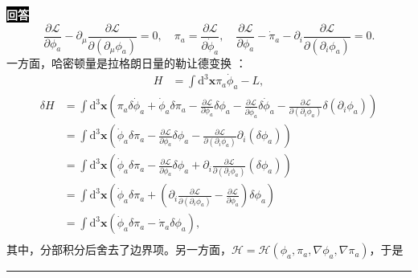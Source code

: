 \documentclass[11pt,a4paper]{ctexart}
\newenvironment{answer}
  {\par\smallskip\noindent
   \begingroup
   \setlength{\fboxsep}{4pt}%
   \colorbox{black}{\textcolor{white}{\bfseries 回答}}%
   \endgroup
   \quad\ignorespaces}
  {\par\smallskip\noindent\rule{\linewidth}{0.4pt}\medskip}
\begin{document}
\begin{answer}
  \begin{equation}
    \frac{\partial \mathcal{L} }{\partial \phi_a } - \partial_\mu \frac{\partial \mathcal{L} }{\partial\left(\partial_\mu\phi_a \right) }
    =0,\quad
    \pi_a
    =\frac{\partial \mathcal{L} }{\partial\dot{\phi}_a },\quad
    \frac{\partial \mathcal{L} }{\partial \phi_a } - \dot{\pi}_a - \partial_i\frac{\partial\mathcal{L} }{\partial\left(\partial_i\phi_a \right) }
    =0. 
  \end{equation}
  一方面，哈密顿量是拉格朗日量的勒让德变换 ：
  \begin{equation}
    \begin{aligned}
      H
      &=\int \mathrm{d}^3\bm{x} \pi_a \dot{\phi}_a - L,
    \end{aligned}
  \end{equation}
  \begin{equation}
    \begin{aligned}
      \delta H
      &=\int \mathrm{d}^3\bm{x} \left(\pi_a \delta\dot{\phi}_a + \dot{\phi}_a\delta \pi_a - \frac{\partial \mathcal{L} }{\partial \phi_a }\delta\phi_a - \frac{\partial \mathcal{L} }{\partial \dot{\phi}_a }\delta\dot{\phi}_a - \frac{\partial \mathcal{L} }{\partial \left(\partial_i \phi_a \right) } \delta\left(\partial_i \phi_a \right)  \right) \\
      &=\int \mathrm{d}^3\bm{x} \left(\dot{\phi}_a\delta \pi_a - \frac{\partial \mathcal{L} }{\partial \phi_a }\delta\phi_a - \frac{\partial \mathcal{L} }{\partial \left(\partial_i \phi_a \right) } \partial_i\left( \delta\phi_a \right)  \right) \\
      &=\int \mathrm{d}^3\bm{x} \left(\dot{\phi}_a\delta \pi_a - \frac{\partial \mathcal{L} }{\partial \phi_a }\delta\phi_a + \partial_i\frac{\partial \mathcal{L} }{\partial \left(\partial_i \phi_a \right) } \left( \delta\phi_a \right)  \right) \\
      &=\int \mathrm{d}^3\bm{x} \left(\dot{\phi}_a\delta \pi_a + \left(\partial_i\frac{\partial \mathcal{L} }{\partial \left(\partial_i \phi_a \right) } - \frac{\partial \mathcal{L} }{\partial \phi_a } \right)\delta\phi_a \right) \\
      &=\int \mathrm{d}^3\bm{x} \left(\dot{\phi}_a\delta \pi_a - \dot{\pi}_a\delta\phi_a \right), \\
    \end{aligned}
  \end{equation}
  其中，分部积分后舍去了边界项。另一方面，$\mathcal{H}=\mathcal{H}(\phi_a,\pi_a,\nabla\phi_a,\nabla\pi_a) $，于是

\end{answer}
\end{document}
